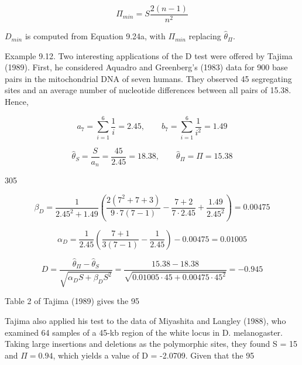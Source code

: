 \documentclass{article}
\begin{document}
\begin{equation}
\Pi_{min}=S\frac{2(n-1)}{n^{2}}
\tag{9.25b}
\label{eq:9_25b}
\end{equation}

 $ D_{min} $ is computed from Equation 9.24a, with  $ \Pi_{min} $ replacing  $ \widehat{\theta}_{\Pi} $.

Example 9.12. Two interesting applications of the D test were offered by Tajima (1989). First, he considered Aquadro and Greenberg's (1983) data for 900 base pairs in the mitochondrial DNA of seven humans. They observed 45 segregating sites and an average number of nucleotide differences between all pairs of 15.38. Hence,

\begin{equation}
a_{7}=\sum_{i=1}^{6}\frac{1}{i}=2.45,\qquad b_{7}=\sum_{i=1}^{6}\frac{1}{i^{2}}=1.49
\end{equation}

\begin{equation}
\widehat{\theta}_{S}=\frac{S}{a_{n}}=\frac{45}{2.45}=18.38,\qquad\widehat{\theta}_{\Pi}=\Pi=15.38
\end{equation}

305

\begin{equation}
\beta_{D}=\frac{1}{2.45^{2}+1.49}\left(\frac{2(7^{2}+7+3)}{9\cdot7(7-1)}-\frac{7+2}{7\cdot2.45}+\frac{1.49}{2.45^{2}}\right)=0.00475
\end{equation}

\begin{equation}
\alpha_{D}=\frac{1}{2.45}\left(\frac{7+1}{3(7-1)}-\frac{1}{2.45}\right)-0.00475=0.01005
\end{equation}

\begin{equation}
D=\frac{\widehat{\theta}_{\Pi}-\widehat{\theta}_{S}}{\sqrt{\alpha_{D}S+\beta_{D}S^{2}}}=\frac{15.38-18.38}{\sqrt{0.01005\cdot45+0.00475\cdot45^{2}}}=-0.945
\end{equation}

Table 2 of Tajima (1989) gives the 95%

Tajima also applied his test to the data of Miyashita and Langley (1988), who examined 64 samples of a 45-kb region of the white locus in D. melanogaster. Taking large insertions and deletions as the polymorphic sites, they found S = 15 and  $ \Pi = 0.94 $, which yields a value of D = -2.0709. Given that the 95%
\end{document}
